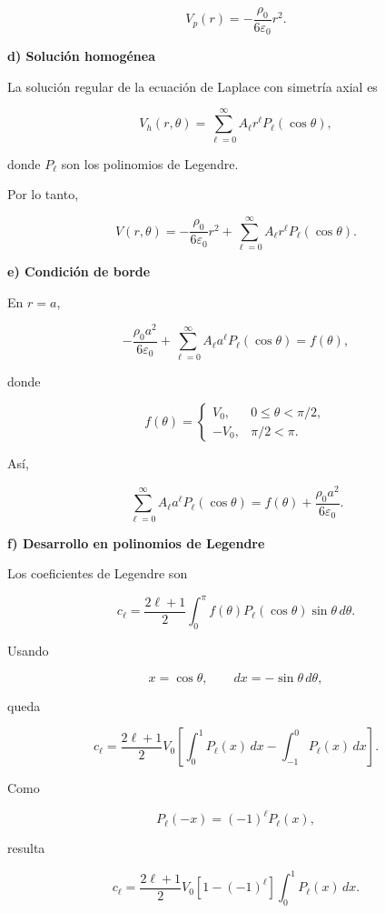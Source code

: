 \documentclass[11pt,spanish]{article}
\begin{document}
\[
\boxed{
V_p(r)
=
-\frac{\rho_0}{6\varepsilon_0}r^2.
}
\]


{\bf d) Solución homogénea}

La solución regular de la ecuación de Laplace con simetría axial es

\[
V_h(r,\theta)
=
\sum_{\ell=0}^{\infty}
A_\ell
r^\ell
P_\ell(\cos\theta),
\]

donde \(P_\ell\) son los polinomios de Legendre.

Por lo tanto,

\[
\boxed{
V(r,\theta)
=
-\frac{\rho_0}{6\varepsilon_0}r^2
+
\sum_{\ell=0}^{\infty}
A_\ell
r^\ell
P_\ell(\cos\theta).
}
\]


{\bf e) Condición de borde}

En \(r=a\),

\[
-\frac{\rho_0a^2}{6\varepsilon_0}
+
\sum_{\ell=0}^{\infty}
A_\ell a^\ell
P_\ell(\cos\theta)
=
f(\theta),
\]

donde

\[
f(\theta)=
\begin{cases}
V_0,&0\le\theta<\pi/2,\\
-V_0,&\pi/2<\pi.
\end{cases}
\]

Así,

\[
\sum_{\ell=0}^{\infty}
A_\ell a^\ell
P_\ell(\cos\theta)
=
f(\theta)
+
\frac{\rho_0a^2}{6\varepsilon_0}.
\]


{\bf f) Desarrollo en polinomios de Legendre}

Los coeficientes de Legendre son

\[
c_\ell
=
\frac{2\ell+1}{2}
\int_0^\pi
f(\theta)
P_\ell(\cos\theta)
\sin\theta\,d\theta.
\]

Usando

\[
x=\cos\theta,
\qquad
dx=-\sin\theta\,d\theta,
\]

queda

\[
c_\ell
=
\frac{2\ell+1}{2}
V_0
\left[
\int_0^1P_\ell(x)\,dx
-
\int_{-1}^0P_\ell(x)\,dx
\right].
\]

Como

\[
P_\ell(-x)=(-1)^\ell P_\ell(x),
\]

resulta

\[
c_\ell
=
\frac{2\ell+1}{2}
V_0
\left[
1-(-1)^\ell
\right]
\int_0^1P_\ell(x)\,dx.
\]
\end{document}

